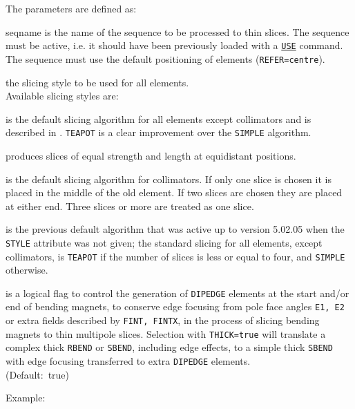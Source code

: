 The parameters are defined as: 
\begin{madlist}
    seqname is the name of the sequence to be
   processed to thin slices. The sequence must be active, i.e. it should
   have been previously loaded with a \hyperref[sec:use]{\tt USE} command.  
   The sequence must use the default positioning of elements ({\tt REFER=centre}).

    the slicing style to be used for all elements. \\
   Available slicing styles are: 

   \begin{madlist}
   	 is the default slicing algorithm for all elements 
   	except collimators and is described in \cite{burkhardt2013}. 
   	{\tt TEAPOT} is a clear improvement over the {\tt SIMPLE} algorithm.
   	
   	 produces slices of equal strength and length at equidistant
   	positions.
   	
   	 is the default slicing algorithm for collimators. 
   	If only one slice is chosen it is placed in the middle of the old
   	element. If two slices are chosen they are placed at either
   	end. Three slices or more are treated as one slice. 
   	
   	 is the previous default algorithm 
   	that was active up to version 5.02.05 when the {\tt STYLE} 
   	attribute was not given; the standard slicing for all
   	elements, except collimators, is {\tt TEAPOT} if the number
   	of slices is less or equal to four, and {\tt SIMPLE} otherwise.
   
   \end{madlist}
   
    is a logical flag to control the generation of
   {\tt DIPEDGE} elements at the start and/or end of bending magnets,
   to conserve edge focusing from pole face angles {\tt E1, E2}
   or extra fields described by {\tt FINT, FINTX}, in the
   process of slicing bending magnets to thin multipole slices.   
   Selection with {\tt THICK=true} will translate a complex thick 
   {\tt RBEND} or {\tt SBEND}, including edge effects, to a simple
   thick {\tt SBEND} with edge focusing transferred to extra 
   {\tt DIPEDGE} elements. \\ 
   (Default:~true)
\end{madlist}

Example:

